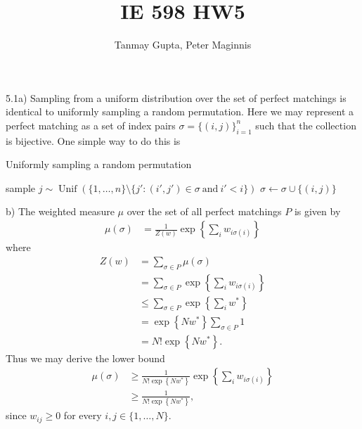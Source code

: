 \documentclass[10pt,onecolumn,letterpaper]{article}
\begin{document}
\title{IE 598 HW5}
\author{Tanmay Gupta, Peter Maginnis}
\maketitle

5.1a) Sampling from a uniform distribution over the set of perfect matchings is identical to uniformly sampling a random permutation.  Here we may represent a perfect matching as a set of index pairs $\sigma=\{(i,j)\}_{i=1}^n$ such that the collection is bijective.  One simple way to do this is
%
%
\begin{algorithm}
\raggedright
  \caption{Uniformly sampling a random permutation}
  \begin{algorithmic}
    \STATE sample $j\sim\operatorname{Unif}\left(\{1,\dotsc, n\}\setminus\{j':(i',j')\in\sigma\ \mathrm{ and }\ i'<i\}\right)$
    \STATE $\sigma\gets\sigma\cup\{(i,j)\}$
     \ENDFOR
  \end{algorithmic}
\end{algorithm}

b) The weighted measure $\mu$ over the set of all perfect matchings $P$ is given by 
\begin{align*}
   \mu(\sigma)&=\frac{1}{Z(w)}\exp\left\{\sum_i w_{i\sigma(i)}\right\}%
\end{align*}
where
\begin{align*}
  Z(w)&=\sum_{\sigma\in P}\mu(\sigma)\\
  &=\sum_{\sigma\in P}\exp\left\{\sum_i w_{i\sigma(i)}\right\}\\
  &\leq\sum_{\sigma\in P}\exp\left\{\sum_i w^*\right\}\\
  &=\exp\left\{Nw^*\right\}\sum_{\sigma\in P}1\\
  &=N!\exp\left\{Nw^*\right\}.
\end{align*}
Thus we may derive the lower bound
\begin{align*}
   \mu(\sigma)&\geq\frac{1}{N!\exp\left\{Nw^*\right\}}\exp\left\{\sum_i w_{i\sigma(i)}\right\}\\
   &\geq\frac{1}{N!\exp\left\{Nw^*\right\}},
\end{align*}
since $w_{ij}\geq0$ for every $i,j\in\{1,\dotsc,N\}$.
\end{document}
